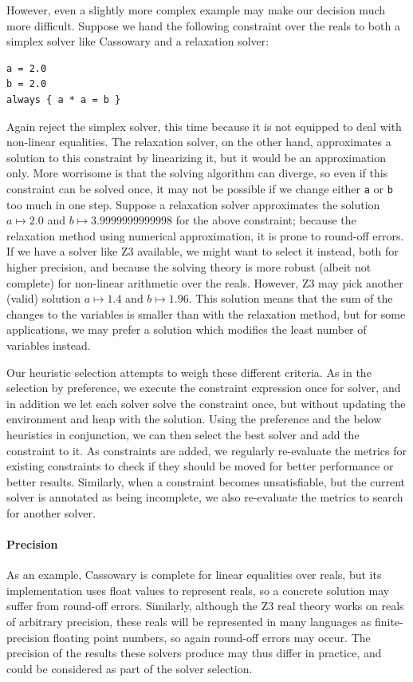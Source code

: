 \documentclass[numbers]{sigplanconf}
\begin{document}
However, even a slightly more complex example may make our decision much more
difficult. Suppose we hand the following constraint over the reals to both a
simplex solver like Cassowary and a relaxation solver:
\begin{lstlisting}
a = 2.0
b = 2.0
always { a * a = b }
\end{lstlisting}
Again reject the simplex solver, this time because it is not equipped to deal
with non-linear equalities. The relaxation solver, on the other hand,
approximates a solution to this constraint by linearizing it, but it would be an
approximation only. More worrisome is that the solving algorithm can diverge, so
even if this constraint can be solved once, it may not be possible if we change
either \verb!a! or \verb!b! too much in one step. Suppose a relaxation solver
approximates the solution $a\mapsto 2.0$ and $b\mapsto 3.9999999999998$ for the
above constraint; because the relaxation method using numerical approximation,
it is prone to round-off errors. If we have a solver like Z3 available, we
might want to select it instead, both for higher precision, and because the
solving theory is more robust (albeit not complete) for non-linear arithmetic
over the reals. However, Z3 may pick another (valid) solution
$a\mapsto 1.4$ and $b\mapsto 1.96$. This solution means that the sum of the
changes to the variables is smaller than with the relaxation method, but for
some applications, we may prefer a solution which modifies the least number of
variables instead.

Our heuristic selection attempts to weigh these different criteria. As in the
selection by preference, we execute the constraint expression once for solver,
and in addition we let each solver solve the constraint once, but without
updating the environment and heap with the solution. Using the preference and
the below heuristics in conjunction, we can then select the best solver and add
the constraint to it. As constraints are added, we regularly re-evaluate the
metrics for existing constraints to check if they should be moved for better
performance or better results. Similarly, when a constraint becomes
unsatisfiable, but the current solver is annotated as being incomplete, we also
re-evaluate the metrics to search for another solver.

\paragraph*{Precision} As an example, Cassowary is complete for linear
equalities over reals, but its implementation uses float values to
represent reals, so a concrete solution may suffer from round-off
errors. Similarly, although the Z3 real theory works on reals of
arbitrary precision, these reals will be represented in many languages
as finite-precision floating point numbers, so again round-off errors
may occur. The precision of the results these solvers produce may thus
differ in practice, and could be considered as part of the solver
selection.
\end{document}
